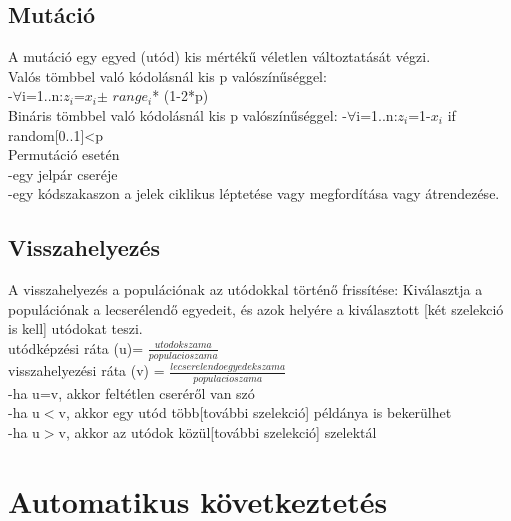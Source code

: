 \documentclass{article}
\begin{document}
	 \subsection{Mutáció}
	 A mutáció egy egyed (utód) kis mértékű véletlen változtatását végzi.\\
	 Valós tömbbel való kódolásnál kis p valószínűséggel:\\
	 -$\forall$i=1..n:$z_i$=$x_i$$\pm$ $range_i$* (1-2*p)\\
	 Bináris tömbbel való kódolásnál kis p valószínűséggel:
	 -$\forall$i=1..n:$z_i$=1-$x_i$ if random[0..1]<p\\
	 Permutáció esetén\\
	 -egy jelpár cseréje\\
	 -egy kódszakaszon a jelek ciklikus léptetése vagy megfordítása vagy átrendezése.\\
	 
	 \newpage
	 \subsection{Visszahelyezés}
	 A visszahelyezés a populációnak az utódokkal történő frissítése: Kiválasztja a populációnak a lecserélendő egyedeit, és azok helyére a kiválasztott [két szelekció is kell] utódokat teszi.\\
	 utódképzési ráta (u)= $\frac{utodok szama}{populacio szama}$\\
	 visszahelyezési ráta (v) = $\frac{lecserelendo egyedek szama}{populacio szama}$\\
	 -ha u=v, akkor feltétlen cseréről van szó\\
	 -ha u$<$v, akkor egy utód több[további szelekció] példánya is bekerülhet\\
	 -ha u$>$v, akkor az utódok közül[további szelekció] szelektál
	 
	\section{Automatikus következtetés}
\end{document}
